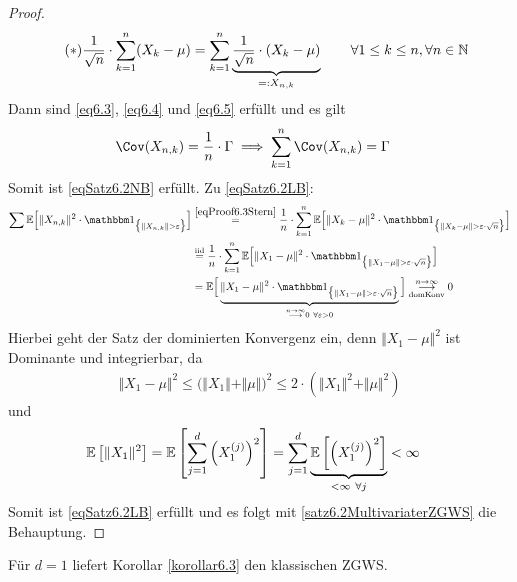 \begin{proof}
\begin{align}\label{eqProof6.3Stern}\tag{$\ast$}
\frac{1}{\sqrt{n}}\cdot\sum\limits_{k=1}^n(X_k-\mu)
&=\sum\limits_{k=1}^n\underbrace{\frac{1}{\sqrt{n}}\cdot(X_k-\mu)}_{=:X_{n,k}}\qquad\forall 1\leq k\leq n,\forall n\in\mathbb{N}
\end{align}
Dann sind \eqref{eq6.3}, \eqref{eq6.4} und \eqref{eq6.5} erfüllt und es gilt
\begin{align*}
\Cov(X_{n,k})
&=\frac{1}{n}\cdot\Gamma\implies\sum\limits_{k=1}^n\Cov(X_{n,k})=\Gamma
\end{align*}
Somit ist \eqref{eqSatz6.2NB} erfüllt. Zu \eqref{eqSatz6.2LB}:
\begin{align*}
\sum\limits\E\Big[\Vert X_{n,k}\Vert^2\cdot\indi_{\big\lbrace\Vert X_{n,k}\Vert>\varepsilon\big\rbrace}\Big]
&\stackeq{\eqref{eqProof6.3Stern}}
\frac{1}{n}\cdot\sum\limits_{k=1}^n\E\Big[\Vert X_k-\mu\Vert^2\cdot\indi_{\big\lbrace\Vert X_k-\mu\Vert>\varepsilon\cdot\sqrt{n}\big\rbrace}\Big]\\
&\stackeq{\text{iid}}
\frac{1}{n}\cdot\sum\limits_{k=1}^n\E\Big[\Vert X_1-\mu\Vert^2\cdot\indi_{\big\lbrace\Vert X_1-\mu\Vert>\varepsilon\cdot\sqrt{n}\big\rbrace}\Big]\\
&=\E\Big[\underbrace{\Vert X_1-\mu\Vert^2\cdot\indi_{\big\lbrace \Vert X_1-\mu\Vert>\varepsilon\cdot\sqrt{n}\big\rbrace}}_{\stackrel{n\to\infty}{\longrightarrow}0~\forall\varepsilon>0}\Big]
\stackrelnew{\text{domKonv}}{n\to\infty}{\longrightarrow}0
\end{align*}
Hierbei geht der Satz der dominierten Konvergenz ein, denn $\Vert X_1-\mu\Vert^2$ ist Dominante und integrierbar, da 
\begin{align*}
\Vert X_1-\mu\Vert^2\leq\big(\Vert X_1\Vert+\Vert\mu\Vert\big)^2\leq 2\cdot\left(\Vert X_1\Vert^2+\Vert\mu\Vert^2\right)
\end{align*}
und 
\begin{align*}
\mathbb{E}\left[\Vert X_1\Vert^2\right]
&=\mathbb{E}\left[\sum\limits_{j=1}^d\left(X_1^{(j)}\right)^2\right]
=\sum\limits_{j=1}^d\underbrace{\mathbb{E}\left[\left(X_1^{(j)}\right)^2\right]}_{<\infty~\forall j}<\infty
\end{align*}
Somit ist \eqref{eqSatz6.2LB} erfüllt und es folgt mit \ref{satz6.2MultivariaterZGWS} die Behauptung.
\end{proof}

Für $d=1$ liefert Korollar \ref{korollar6.3} den klassischen ZGWS.

